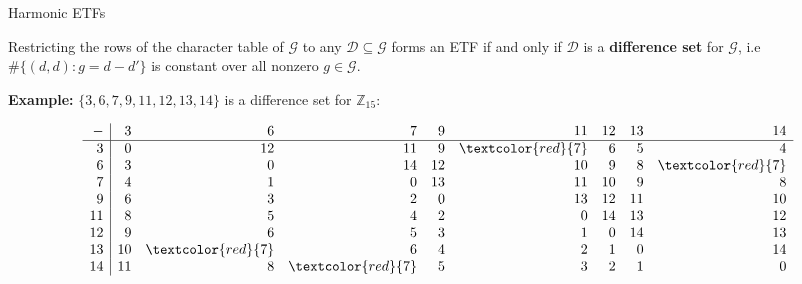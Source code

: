 \documentclass[12pt]{beamer}
\newcommand{\bbZ}{\mathbb{Z}}
\newcommand{\calD}{\mathcal{D}}
\newcommand{\calG}{\mathcal{G}}
\begin{document}
\begin{frame}[noframenumbering]{Harmonic ETFs}

Restricting the rows of the character table of $\calG$ to any $\calD\subseteq\calG$ forms an ETF if and only if $\calD$ is a \textbf{difference set} for $\calG$, i.e $\#\{(d,d):g=d-d'\}$ is constant over all nonzero $g\in\calG$.

\vfill

\textbf{Example:}
$\{3,6,7,9,11,12,13,14\}$ is a difference set for $\bbZ_{15}$:

\footnotesize{
\begin{equation*}
\begin{array}{r|rrrrrrrr}
 -& 3& 6&7 & 9&11&12&13&14\\\hline
 3& 0&12&11& 9& \textcolor{red}{7}& 6& 5& 4\\
 6& 3& 0&14&12&10& 9& 8& \textcolor{red}{7}\\
 7& 4& 1& 0&13&11&10& 9& 8\\
 9& 6& 3& 2& 0&13&12&11&10\\
11& 8& 5& 4& 2& 0&14&13&12\\
12& 9& 6& 5& 3& 1& 0&14&13\\
13&10& \textcolor{red}{7}& 6& 4& 2& 1& 0&14\\
14&11& 8& \textcolor{red}{7}& 5& 3& 2& 1& 0
\end{array}
\end{equation*}
}

\end{frame}
\end{document}

